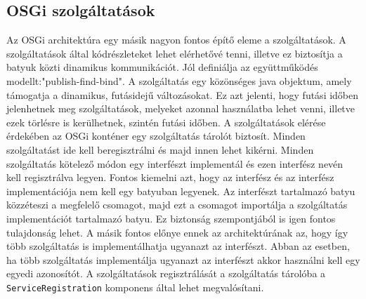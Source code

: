 \subsection{OSGi szolgáltatások}

Az OSGi architektúra egy másik nagyon fontos építő eleme a szolgáltatások. A szolgáltatások által kódrészleteket lehet elérhetővé tenni, illetve ez biztosítja a batyuk közti dinamikus kommunikációt. Jól definiálja az együttműködés modellt:"publish-find-bind". A szolgáltatás egy közönséges java objektum, amely támogatja a dinamikus, futásidejű változásokat. Ez azt jelenti, hogy futási időben jelenhetnek meg szolgáltatások, melyeket azonnal használatba lehet venni, illetve ezek törlésre is kerülhetnek, szintén futási időben. A szolgáltatások elérése érdekében az OSGi konténer egy szolgáltatás tárolót biztosít. Minden szolgáltatást ide kell beregisztrálni és majd innen lehet kikérni. Minden szolgáltatás kötelező módon egy interfészt implementál és ezen interfész nevén kell regisztrálva legyen. Fontos kiemelni azt, hogy az interfész és az interfész implementációja nem kell egy batyuban legyenek. Az interfészt tartalmazó batyu közzéteszi a megfelelő csomagot, majd ezt a csomagot importálja a szolgáltatás implementációt tartalmazó batyu. Ez biztonság szempontjából is igen fontos tulajdonság lehet. A másik fontos előnye ennek az architektúrának az, hogy így több szolgáltatás is implementálhatja ugyanazt az interfészt. Abban az esetben, ha több szolgáltatás implementálja ugyanazt az interfészt akkor használni kell egy egyedi azonosítót. A szolgáltatások regisztrálását a szolgáltatás tárolóba a \texttt{ServiceRegistration} komponens által lehet megvalósítani.

\lstset{language=Java}


